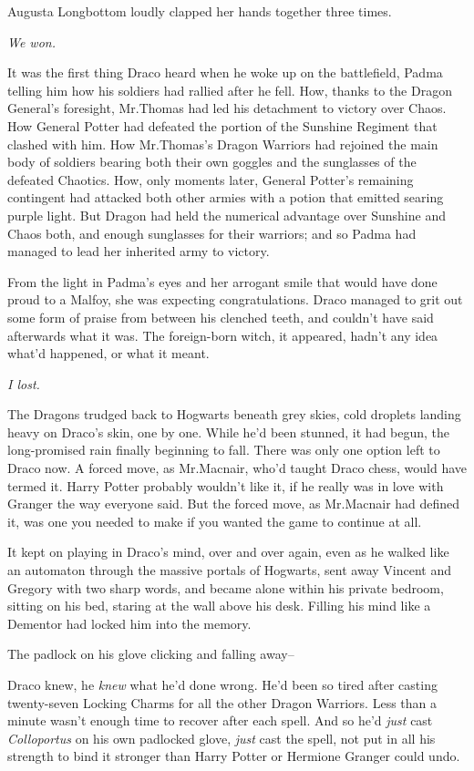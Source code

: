 Augusta Longbottom loudly clapped her hands together three times.

\later

\emph{We won.}

It was the first thing Draco heard when he woke up on the battlefield, Padma telling him how his soldiers had rallied after he fell. How, thanks to the Dragon General's foresight, Mr.\?Thomas had led his detachment to victory over Chaos. How General Potter had defeated the portion of the Sunshine Regiment that clashed with him. How Mr.\?Thomas's Dragon Warriors had rejoined the main body of soldiers bearing both their own goggles and the sunglasses of the defeated Chaotics. How, only moments later, General Potter's remaining contingent had attacked both other armies with a potion that emitted searing purple light. But Dragon had held the numerical advantage over Sunshine and Chaos both, and enough sunglasses for their warriors; and so Padma had managed to lead her inherited army to victory.

From the light in Padma's eyes and her arrogant smile that would have done proud to a Malfoy, she was expecting congratulations. Draco managed to grit out some form of praise from between his clenched teeth, and couldn't have said afterwards what it was. The foreign-born witch, it appeared, hadn't any idea what'd happened, or what it meant.

\emph{I lost.}

The Dragons trudged back to Hogwarts beneath grey skies, cold droplets landing heavy on Draco's skin, one by one. While he'd been stunned, it had begun, the long-promised rain finally beginning to fall. There was only one option left to Draco now. A forced move, as Mr.\?Macnair, who'd taught Draco chess, would have termed it. Harry Potter probably wouldn't like it, if he really was in love with Granger the way everyone said. But the forced move, as Mr.\?Macnair had defined it, was one you needed to make if you wanted the game to continue at all.

It kept on playing in Draco's mind, over and over again, even as he walked like an automaton through the massive portals of Hogwarts, sent away Vincent and Gregory with two sharp words, and became alone within his private bedroom, sitting on his bed, staring at the wall above his desk. Filling his mind like a Dementor had locked him into the memory.

The padlock on his glove clicking and falling away\---

Draco knew, he \emph{knew} what he'd done wrong. He'd been so tired after casting twenty-seven Locking Charms for all the other Dragon Warriors. Less than a minute wasn't enough time to recover after each spell. And so he'd \emph{just} cast \emph{Colloportus} on his own padlocked glove, \emph{just} cast the spell, not put in all his strength to bind it stronger than Harry Potter or Hermione Granger could undo.

